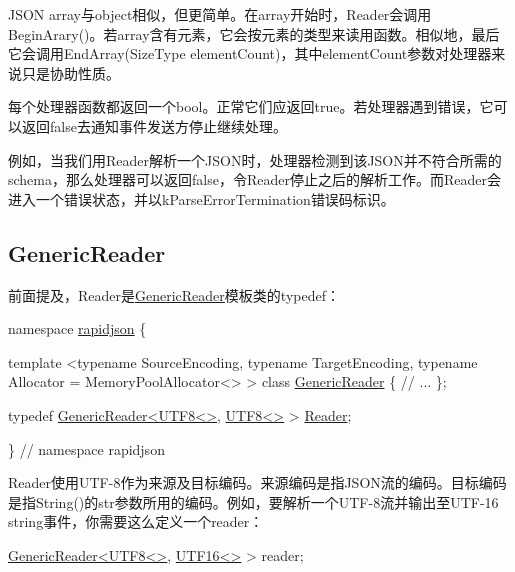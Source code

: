 J\+S\+ON array与object相似，但更简单。在array开始时，{\ttfamily Reader}会调用{\ttfamily Begin\+Arary()}。若array含有元素，它会按元素的类型来读用函数。相似地，最后它会调用{\ttfamily End\+Array(\+Size\+Type element\+Count)}，其中{\ttfamily element\+Count}参数对处理器来说只是协助性质。

每个处理器函数都返回一个{\ttfamily bool}。正常它们应返回{\ttfamily true}。若处理器遇到错误，它可以返回{\ttfamily false}去通知事件发送方停止继续处理。

例如，当我们用{\ttfamily Reader}解析一个\+J\+S\+O\+N时，处理器检测到该\+J\+S\+O\+N并不符合所需的schema，那么处理器可以返回{\ttfamily false}，令{\ttfamily Reader}停止之后的解析工作。而{\ttfamily Reader}会进入一个错误状态，并以{\ttfamily k\+Parse\+Error\+Termination}错误码标识。\hypertarget{md_Cadriciel_Commun_Externe_RapidJSON_doc_sax.zh-cn_GenericReader}{}\subsection{Generic\+Reader}\label{md_Cadriciel_Commun_Externe_RapidJSON_doc_sax.zh-cn_GenericReader}
前面提及，{\ttfamily Reader}是{\ttfamily \hyperlink{class_generic_reader}{Generic\+Reader}}模板类的typedef：


\begin{DoxyCode}
\textcolor{keyword}{namespace }\hyperlink{namespacerapidjson}{rapidjson} \{

\textcolor{keyword}{template} <\textcolor{keyword}{typename} SourceEncoding, \textcolor{keyword}{typename} TargetEncoding, \textcolor{keyword}{typename} Allocator = MemoryPoolAllocator<> >
\textcolor{keyword}{class }\hyperlink{class_generic_reader}{GenericReader} \{
    \textcolor{comment}{// ...}
\};

\textcolor{keyword}{typedef} \hyperlink{class_generic_reader}{GenericReader<UTF8<>}, \hyperlink{struct_u_t_f8}{UTF8<>} > \hyperlink{reader_8h_a84f3b66a66647f4ac4267078359188ba}{Reader};

\} \textcolor{comment}{// namespace rapidjson}
\end{DoxyCode}


{\ttfamily Reader}使用\+U\+T\+F-\/8作为来源及目标编码。来源编码是指\+J\+S\+O\+N流的编码。目标编码是指{\ttfamily String()}的{\ttfamily str}参数所用的编码。例如，要解析一个\+U\+T\+F-\/8流并输出至\+U\+T\+F-\/16 string事件，你需要这么定义一个reader：


\begin{DoxyCode}
\hyperlink{class_generic_reader}{GenericReader<UTF8<>}, \hyperlink{struct_u_t_f16}{UTF16<>} > reader;
\end{DoxyCode}


